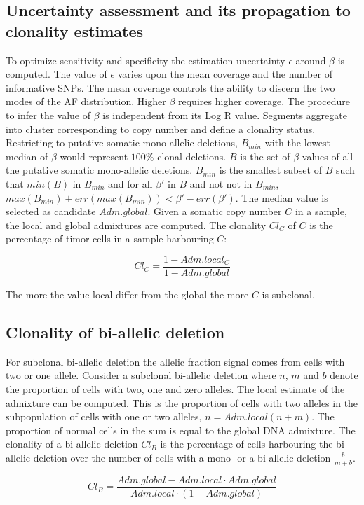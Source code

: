 	\subsection{Uncertainty assessment and its propagation to clonality estimates}
	To optimize sensitivity and specificity the estimation uncertainty $\epsilon$ around $\beta$ is computed.
	The value of $\epsilon$ varies upon the mean coverage and the number of informative SNPs.
	The mean coverage controls the ability to discern the two modes of the AF distribution.
	Higher $\beta$ requires higher coverage.
	The procedure to infer the value of $\beta$ is independent from its Log R value.
	Segments aggregate into cluster corresponding to copy number and define a clonality status.
	Restricting to putative somatic mono-allelic deletions, $B_{min}$ with the lowest median of $\beta$ would represent $100\%$ clonal deletions.
	$B$ is the set of $\beta$ values of all the putative somatic mono-allelic deletions.
	$B_{min}$ is the smallest subset of $B$ such that $min(B)$ in $B_{min}$ and for all $\beta'$ in $B$ and not not in $B_{min}$, $max(B_{min})+err(max(B_{min})) < \beta'-err(\beta')$.
	The median value is selected as candidate $Adm.global$.
	Given a somatic copy number $C$ in a sample, the local and global admixtures are computed.
	The clonality $Cl_C$ of $C$ is the percentage of timor cells in a sample harbouring $C$:

	$$Cl_C = \frac{1-Adm.local_C}{1-Adm.global}$$

	The more the value local differ from the global the more $C$ is subclonal.

	\subsection{Clonality of bi-allelic deletion}
	For subclonal bi-allelic deletion the allelic fraction signal comes from cells with two or one allele.
	Consider a subclonal bi-allelic deletion where $n$, $m$ and $b$ denote the proportion of cells with two, one and zero alleles.
	The local estimate of the admixture can be computed.
	This is the proportion of cells with two alleles in the subpopulation of cells with one or two alleles, $n = Adm.local(n+m)$.
	The proportion of normal cells in the sum is equal to the global DNA admixture.
	The clonality of a bi-allelic deletion $Cl_B$ is the percentage of cells harbouring the bi-allelic deletion over the number of cells with a mono- or a bi-allelic deletion $\frac{b}{m+b}$.

	$$Cl_B = \frac{Adm.global - Adm.local\cdot Adm.global}{Adm.local\cdot(1-Adm.global)}$$
